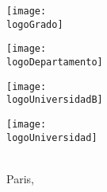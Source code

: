 \begin{titlepage}
	\noindent\hspace*{\centeroffset}
	\begin{minipage}{\textwidth}
		\centering
		\noindent\hspace*{\centeroffset}
		\begin{center}
			{\texttt{[image: \\logoGrado]}}
		\end{center}
		\vspace*{2em}
		\centering
		\noindent\hspace*{\centeroffset}
		\begin{minipage}[l]{4.2cm}
			\texttt{[image: \\logoDepartamento]}
		\end{minipage}
		\begin{minipage}[c]{4.2cm}
			\texttt{[image: \\logoUniversidadB]}
		\end{minipage}
		\begin{minipage}[r]{4.2cm}
			\texttt{[image: \\logoUniversidad]}
		\end{minipage}
		\\[1cm]
		Paris, \Hoy
	\end{minipage}


\end{titlepage}

\restoregeometry


